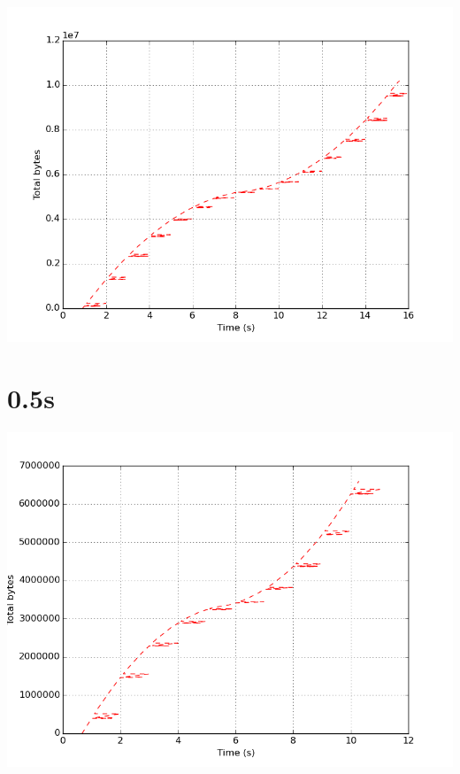 \documentclass{article}
\begin{document}
    \begin{center}
    \includegraphics{set_a_0.75s/set_a_0_75s.png}
    \end{center}
\clearpage

\section{0.5s}
    \noindent\begin{minipage}{.45\textwidth}
    
    \end{minipage}\hfill
    \begin{minipage}{.45\textwidth}
    
    \end{minipage}
    
    \begin{center}
    \includegraphics{set_a_0.5s/set_a_0_5s.png}
    \end{center}
\clearpage
\end{document}
